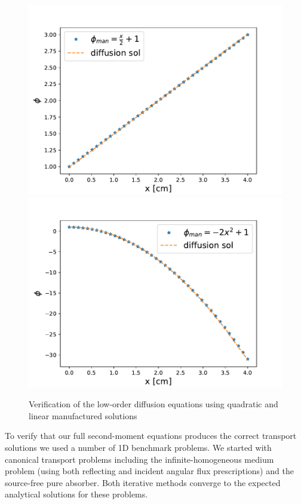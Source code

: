 \begin{figure}
    \centering
    \includegraphics[width=.49\linewidth]{figures/smm_paper/linear_mms.pdf}
    \includegraphics[width=.49\linewidth]{figures/smm_paper/quadratic_mms.pdf}
    \caption{Verification of the low-order diffusion equations using quadratic and linear manufactured solutions}
    \label{fig:diffusion_mms}
\end{figure}

To verify that our full second-moment equations produces the correct transport solutions we used a number of 1D benchmark problems.
We started with canonical transport problems including the infinite-homogeneous medium problem (using both reflecting and incident angular flux prescriptions) and the source-free pure absorber.
Both iterative methods converge to the expected analytical solutions for these problems.

